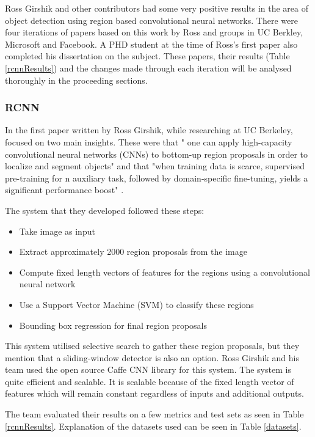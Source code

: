Ross Girshik and other contributors had some very positive results in the area
of object detection using region based convolutional neural networks. There were
four iterations of papers based on this work by Ross and groups in UC Berkley,
Microsoft and Facebook. A PHD student at the time of Ross's first paper also
completed his dissertation on the subject. These papers, their
results (Table \ref{rcnnResults}) and the changes made through each iteration will be analysed thoroughly in the proceeding sections.

\subsubsection*{RCNN}
In the first paper written by Ross Girshik, while researching at UC Berkeley,
focused on two main insights. These were that " one can apply high-capacity convolutional neural networks (CNNs) to bottom-up region proposals in order to localize and segment objects" and that
"when training data is scarce, supervised pre-training for n auxiliary task,
followed by domain-specific fine-tuning, yields a significant performance boost"
\parencite{rcnn}.

The system that they developed followed these steps:
\begin{itemize}
    \item{Take image as input}
    \item{Extract approximately 2000 region proposals from the image}
    \item{Compute fixed length vectors of features for the regions using a convolutional
        neural network}
    \item{Use a Support Vector Machine (SVM) to classify these regions}
    \item{Bounding box regression for final region proposals}
\end{itemize}

This system utilised selective search to gather these region proposals, but they
mention that a sliding-window detector is also an option. Ross Girshik and his
team used the open source Caffe CNN library for this system. The system is quite
efficient and scalable. It is scalable because of the fixed length vector of
features which will remain constant regardless of inputs and additional outputs.

The team evaluated their results on a few metrics and test sets as seen in Table
\ref{rcnnResults}. Explanation of the datasets used can be seen in Table \ref{datasets}.

